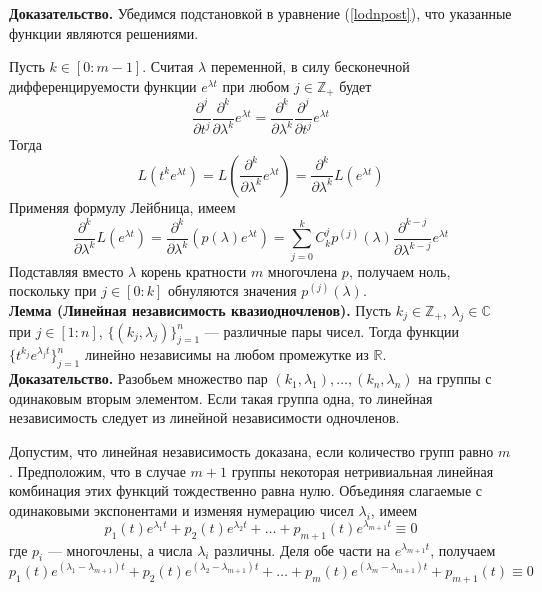 \noindent \textbf{Доказательство.} Убедимся подстановкой в уравнение (\ref{lodnpost}), что указанные функции являются решениями.

Пусть $k \in [0 : m-1]$. Считая $\lambda$ переменной, в силу бесконечной дифференцируемости функции $e^{\lambda t}$ при любом $j \in \mathbb{Z}_{+}$ будет
\begin{equation*}
    \frac{\partial^j}{\partial t^j}\frac{\partial^k}{\partial \lambda^k}e^{\lambda t} = \frac{\partial^k}{\partial\lambda^k}\frac{\partial^j}{\partial t^j}e^{\lambda t}
\end{equation*}
Тогда
\begin{equation*}
    L(t^ke^{\lambda t}) = L\left(\frac{\partial^k}{\partial\lambda^k}e^{\lambda t} \right) = \frac{\partial^k}{\partial\lambda^k}L(e^{\lambda t})
\end{equation*}
Применяя формулу Лейбница, имеем
\begin{equation*}
    \frac{\partial^k}{\partial\lambda^k}L(e^{\lambda t}) = \frac{\partial^k}{\partial\lambda^k} (p(\lambda)e^{\lambda t}) = \sum_{j = 0}^k C_k^j p^{(j)}(\lambda)\frac{\partial^{k - j}}{\partial\lambda^{k - j}} e^{\lambda t}
\end{equation*}
Подставляя вместо $\lambda$ корень кратности $m$ многочлена $p$, получаем ноль, поскольку при $j \in [0 : k]$ обнуляются значения $p^{(j)}(\lambda)$.\\

\noindent \textbf{Лемма (Линейная независимость квазиодночленов).} Пусть $k_j \in \mathbb{Z}_{+}$, $\lambda_j \in \mathbb{C}$ при $j \in [1 : n]$, $\{(k_j,\lambda_j)\}_{j=1}^n$ --- различные пары чисел. Тогда функции $\{t^{k_j}e^{\lambda_jt}\}_{j=1}^n$ линейно независимы на любом промежутке из $\mathbb{R}$.\\

\noindent \textbf{Доказательство.} Разобьем множество пар $(k_1, \lambda_1), \ldots, (k_n, \lambda_n)$ на группы с одинаковым вторым элементом. Если такая группа одна, то линейная независимость следует из линейной независимости одночленов.

Допустим, что линейная независимость доказана, если количество групп равно $m$. Предположим, что в случае $m + 1$ группы некоторая нетривиальная линейная комбинация этих функций тождественно равна нулю. Объединяя слагаемые с одинаковыми экспонентами и изменяя нумерацию чисел $\lambda_i$, имеем
\begin{equation*}
    p_1(t)e^{\lambda_1 t} + p_2(t)e^{\lambda_2 t} + \ldots + p_{m+1}(t)e^{\lambda_{m+1}t} \equiv 0
\end{equation*}
где $p_i$ --- многочлены, а числа $\lambda_i$ различны. Деля обе части на $e^{\lambda_{m+1}t}$, получаем
\begin{equation*}
    p_1(t)e^{(\lambda_1 - \lambda_{m+1}) t} + p_2(t)e^{(\lambda_2 - \lambda_{m+1}) t} + \ldots + p_m(t)e^{(\lambda_m - \lambda_{m+1}) t} + p_{m+1}(t) \equiv 0
\end{equation*}

